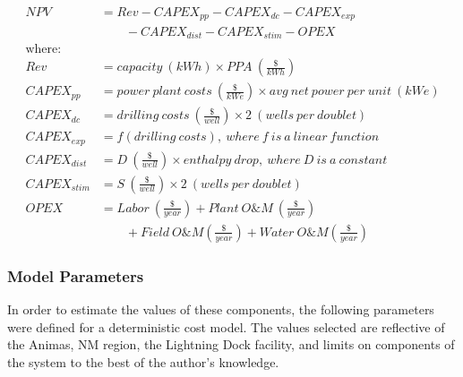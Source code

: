 \begin{equation}
    \label{eq:npv_components}
    \begin{aligned}
    NPV &= Rev - CAPEX_{pp} - CAPEX_{dc} - CAPEX_{exp} \\ 
        &\qquad- CAPEX_{dist} - CAPEX_{stim} - OPEX \\
    \text{where:}\\
    Rev &= capacity\ (kWh) \times PPA\ \left(\frac{\$}{kWh}\right) \\
    CAPEX_{pp} &= power\ plant\ costs\ \left(\frac{\$}{kWe}\right) \times
    avg\ net\ power\ per\ unit\ (kWe)\\
    CAPEX_{dc} &= drilling\ costs\ \left(\frac{\$}{well}\right) \times 2\ (wells\ per\ doublet)\\
    CAPEX_{exp} &= f(drilling\ costs),\ where\ f\ is\ a\ linear\ function\\
    CAPEX_{dist} &= D\ \left(\frac{\$}{well}\right) \times enthalpy\ drop,\ where\ D\ is\ a\ constant\\
    CAPEX_{stim} &= S\ \left(\frac{\$}{well}\right) \times 2\ (wells\ per\ doublet)\\
    OPEX &= Labor\ \left(\frac{\$}{year}\right)+ Plant\ O\&M\ \left(\frac{\$}{year}\right)\\
    &\qquad+ Field\ O\&M \left(\frac{\$}{year}\right) + Water\ O\&M \left(\frac{\$}{year}\right)
    \end{aligned}
\end{equation}

\subsubsection{Model Parameters}

In order to estimate the values of these components, the following parameters were defined for a deterministic cost model. The values selected are reflective of the Animas, NM region, the Lightning Dock facility, and limits on components of the system to the best of the author's knowledge.

